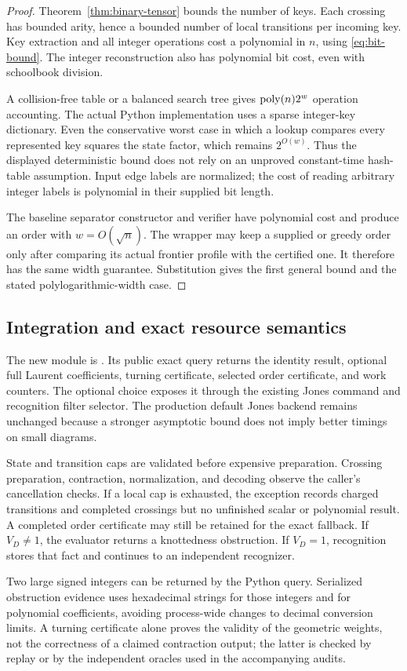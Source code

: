 \begin{proof}
Theorem~\ref{thm:binary-tensor} bounds the number of keys. Each crossing
has bounded arity, hence a bounded number of local transitions per
incoming key. Key extraction and all integer operations cost a polynomial
in $n$, using \eqref{eq:bit-bound}. The integer reconstruction also has
polynomial bit cost, even with schoolbook division.

A collision-free table or a balanced search tree gives
$\operatorname{poly}(n)2^w$ operation accounting. The actual Python implementation uses
a sparse integer-key dictionary. Even the conservative worst case in
which a lookup compares every represented key squares the state factor,
which remains $2^{O(w)}$. Thus the displayed deterministic bound does
not rely on an unproved constant-time hash-table assumption. Input edge
labels are normalized; the cost of reading arbitrary integer labels is
polynomial in their supplied bit length.

The baseline separator constructor and verifier have polynomial cost and
produce an order with $w=O(\sqrt n)$. The wrapper may keep a supplied or
greedy order only after comparing its actual frontier profile with the
certified one. It therefore has the same width guarantee. Substitution
gives the first general bound and the stated polylogarithmic-width case.
\end{proof}

\subsection{Integration and exact resource semantics}

The new module is . Its public exact
query returns the identity result, optional full Laurent coefficients,
turning certificate, selected order certificate, and work counters.
The optional  choice exposes it through the existing
Jones command and recognition filter selector. The production default
Jones backend remains unchanged because a stronger asymptotic bound
does not imply better timings on small diagrams.

State and transition caps are validated before expensive preparation.
Crossing preparation, contraction, normalization, and decoding observe
the caller's cancellation checks. If a local cap is exhausted, the
exception records charged transitions and completed crossings but no
unfinished scalar or polynomial result. A completed order certificate
may still be retained for the exact fallback. If $V_D\ne1$, the evaluator
returns a knottedness obstruction. If $V_D=1$, recognition stores that
fact and continues to an independent recognizer.

Two large signed integers can be returned by the Python query. Serialized
obstruction evidence uses hexadecimal strings for those integers and for
polynomial coefficients, avoiding process-wide changes to decimal
conversion limits. A turning certificate alone proves the validity of
the geometric weights, not the correctness of a claimed contraction
output; the latter is checked by replay or by the independent oracles
used in the accompanying audits.
